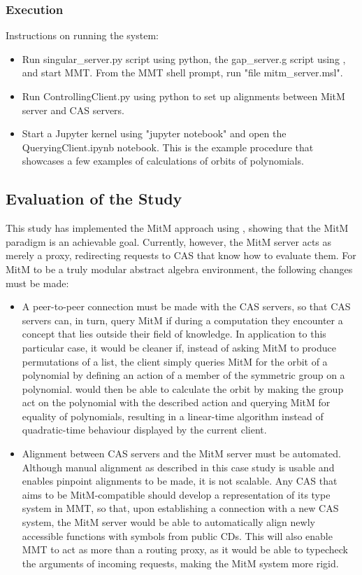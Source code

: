 \subsubsection{Execution}
Instructions on running the system:
\begin{itemize}
  \item Run singular\_server.py script using python, the gap\_server.g script
    using \GAP, and start MMT. From the MMT shell prompt, run 
    "file mitm\_server.msl".
  \item Run ControllingClient.py using python to set up alignments between
    MitM server and CAS servers.
  \item Start a Jupyter kernel using "jupyter notebook" and open the 
    QueryingClient.ipynb notebook. This is the example procedure that showcases
    a few examples of calculations of orbits of polynomials.
\end{itemize}

\subsection{Evaluation of the Study}
This study has implemented the MitM approach using \SCSCP, showing that the MitM 
paradigm is an achievable goal. Currently, however, the MitM server acts as 
merely a proxy, redirecting \SCSCP requests to CAS that know how to evaluate them.
For MitM to be a truly modular abstract algebra environment, the following
changes must be made:
\begin{itemize}
  \item A peer-to-peer connection must be made with the CAS servers, so that
    CAS servers can, in turn, query MitM if during a computation they encounter 
    a concept that lies outside their field of knowledge. In application to
    this particular case, it would be cleaner if, instead of asking MitM to 
    produce permutations of a list, the client simply queries MitM for the orbit 
    of a polynomial by defining an action of a member of the symmetric group on a 
    polynomial. \GAP would then be able to calculate the orbit by making the group 
    act on the polynomial with the described action and querying MitM for 
    equality of polynomials, resulting in a linear-time algorithm instead of
    quadratic-time behaviour displayed by the current client.
  \item Alignment between CAS servers and the MitM server must be automated.
    Although manual alignment as described in this case study is usable and
    enables pinpoint alignments to be made, it is not scalable. Any CAS that aims
    to be MitM-compatible should develop a representation of its type system
    in MMT, so that, upon establishing a connection with a new CAS system, the 
    MitM server would be able to automatically align newly accessible functions 
    with symbols from public CDs. This will also enable MMT to act as more than
    a routing proxy, as it would be able to typecheck the arguments of incoming
    requests, making the MitM system more rigid.
\end{itemize}

